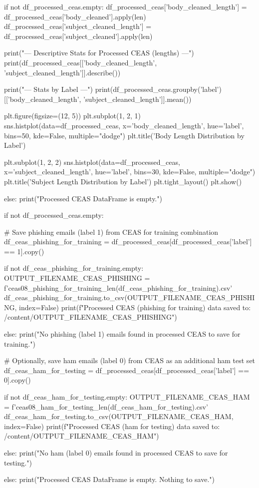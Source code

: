 \begin{ffcode}
if not df_processed_ceas.empty:
    df_processed_ceas['body_cleaned_length'] = df_processed_ceas['body_cleaned'].apply(len)
    df_processed_ceas['subject_cleaned_length'] = df_processed_ceas['subject_cleaned'].apply(len)

    print("--- Descriptive Stats for Processed CEAS (lengths) ---")
    print(df_processed_ceas[['body_cleaned_length', 'subject_cleaned_length']].describe())

    print("\n--- Stats by Label ---")
    print(df_processed_ceas.groupby('label')[['body_cleaned_length', 'subject_cleaned_length']].mean())

    plt.figure(figsize=(12, 5))
    plt.subplot(1, 2, 1)
    sns.histplot(data=df_processed_ceas, x='body_cleaned_length', hue='label', bins=50, kde=False, multiple="dodge")
    plt.title('Body Length Distribution by Label')

    plt.subplot(1, 2, 2)
    sns.histplot(data=df_processed_ceas, x='subject_cleaned_length', hue='label', bins=30, kde=False, multiple="dodge")
    plt.title('Subject Length Distribution by Label')
    plt.tight_layout()
    plt.show()

else:
    print("Processed CEAS DataFrame is empty.")

if not df_processed_ceas.empty:

    # Save phishing emails (label 1) from CEAS for training combination
    df_ceas_phishing_for_training = df_processed_ceas[df_processed_ceas['label'] == 1].copy()

    if not df_ceas_phishing_for_training.empty:
        OUTPUT_FILENAME_CEAS_PHISHING = f'ceas08_phishing_for_training_{len(df_ceas_phishing_for_training)}.csv'
        df_ceas_phishing_for_training.to_csv(OUTPUT_FILENAME_CEAS_PHISHING, index=False)
        print(f"Processed CEAS (phishing for training) data saved to: /content/{OUTPUT_FILENAME_CEAS_PHISHING}")

    else:
        print("No phishing (label 1) emails found in processed CEAS to save for training.")

    # Optionally, save ham emails (label 0) from CEAS as an additional ham test set
    df_ceas_ham_for_testing = df_processed_ceas[df_processed_ceas['label'] == 0].copy()

    if not df_ceas_ham_for_testing.empty:
        OUTPUT_FILENAME_CEAS_HAM = f'ceas08_ham_for_testing_{len(df_ceas_ham_for_testing)}.csv'
        df_ceas_ham_for_testing.to_csv(OUTPUT_FILENAME_CEAS_HAM, index=False)
        print(f"Processed CEAS (ham for testing) data saved to: /content/{OUTPUT_FILENAME_CEAS_HAM}")

    else:
        print("No ham (label 0) emails found in processed CEAS to save for testing.")

else:
    print("Processed CEAS DataFrame is empty. Nothing to save.")
\end{ffcode}